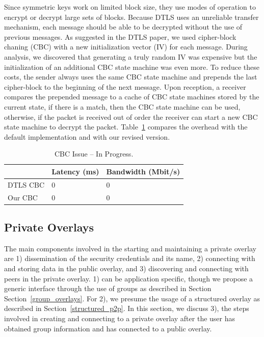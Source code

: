 \documentclass[conference]{IEEEtran}
\begin{document}
Since symmetric keys work on limited block size, they use modes of operation
to encrypt or decrypt large sets of blocks.  Because DTLS uses an unreliable
transfer mechanism, each message should be able to be decrypted without the use
of previous messages.  As suggested in the DTLS paper, we used cipher-block
chaning (CBC) with a new initialization vector (IV) for each message.  During
analysis, we discovered that generating a truly random IV was expensive but the
initialization of an additional CBC state machine was even more.  To reduce
these costs, the sender always uses the same CBC state machine and prepends
the last cipher-block to the beginning of the next message.  Upon reception,
a receiver compares the prepended message to a cache of CBC state machines
stored by the current state, if there is a match, then the CBC state machine
can be used, otherwise, if the packet is received out of order the receiver
can start a new CBC state machine to decrypt the packet.  Table~\ref{tab:cbc_issue}
compares the overhead with the default implementation and with our revised
version.

\begin{table}[h]
\setlength{\itemsep}{0pt}
\setlength{\parskip}{0pt}
\centering
\begin{tabular}[c]{|m{1.5cm}||m{3cm}|m{3cm}|} \hline
& Latency (ms) & Bandwidth (Mbit/s) \\ \hline\hline
DTLS CBC & 0 & 0 \\ \hline
Our CBC & 0 & 0 \\ \hline
\end{tabular}
\caption{CBC Issue -- In Progress.}
\label{tab:cbc_issue}
\end{table}

\subsection{Private Overlays}
The main components involved in the starting and maintaining a private overlay
are 1) dissemination of the security credentials and its name, 2) connecting
with and storing data in the public overlay, and 3) discovering and connecting
with peers in the private overlay.  1) can be application specific, though we
propose a generic interface through the use of groups as described in Section
Section~\ref{group_overlays}.  For 2), we presume the usage of a structured
overlay as described in Section~\ref{structured_p2p}.  In this section, we
discuss 3), the steps involved in creating and connecting to a private overlay
after the user has obtained group information and has connected to a public
overlay.
\end{document}
